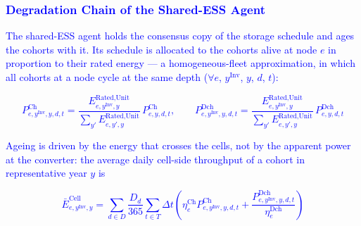 

\subsubsection{\textcolor{blue}{Degradation Chain of the Shared-ESS Agent}}

\textcolor{blue}{The shared-ESS agent holds the consensus copy of the storage schedule and ages the cohorts
with it. Its schedule is allocated to the cohorts alive at node $e$ in proportion to their rated energy --- a
homogeneous-fleet approximation, in which all cohorts at a node cycle at the same depth ($\forall e$,
$y^\text{Inv}$, $y$, $d$, $t$):}

\textcolor{blue}{
    \begin{equation}
        P^{\text{Ch}}_{e,y^\text{Inv},y,d,t} = \frac{E^{\text{Rated,Unit}}_{e,y^\text{Inv},y}}{\sum_{y'} E^{\text{Rated,Unit}}_{e,y',y}}\, P^{\text{Ch}}_{e,y,d,t},
        \qquad
        P^{\text{Dch}}_{e,y^\text{Inv},y,d,t} = \frac{E^{\text{Rated,Unit}}_{e,y^\text{Inv},y}}{\sum_{y'} E^{\text{Rated,Unit}}_{e,y',y}}\, P^{\text{Dch}}_{e,y,d,t}
        \label{eq:cohort_allocation}
    \end{equation}
}


\textcolor{blue}{Ageing is driven by the energy that crosses the cells, not by the apparent power at the
converter: the average daily cell-side throughput of a cohort in representative year $y$ is}

\textcolor{blue}{
    \begin{equation}
        \bar{E}^{\text{Cell}}_{e,y^\text{Inv},y} =
        \sum_{d \in D} \frac{D_d}{365} \sum_{t \in T} \Delta t
        \left(
            \eta^{\text{Ch}}_e P^{\text{Ch}}_{e,y^\text{Inv},y,d,t}
            +
            \frac{P^{\text{Dch}}_{e,y^\text{Inv},y,d,t}}{\eta^{\text{Dch}}_e}
        \right)
        \label{eq:cell_throughput}
    \end{equation}
}

